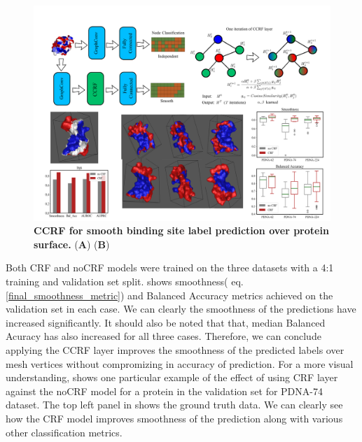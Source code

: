\begin{center}
\begin{figure}[!htp]
                \includegraphics[width=\textwidth]{crf_figs/demo_crf_fig.png}
        \caption[CCRF for smooth binding site label prediction over protein surface.]{\textbf{CCRF
        for smooth binding site label prediction over protein surface.} ({\bf A}) ({\bf B}) }
        \label{fig:ccrf} \end{figure} \end{center}

Both CRF and noCRF models were trained on the three datasets with a 4:1 training and validation set
        split.  shows smoothness( eq.
        \ref{final_smoothness_metric}) and Balanced Accuracy  metrics achieved on the validation set
        in each case. We can clearly the smoothness of the predictions have increased significantly.
        It should also be noted that that, median Balanced Acuracy has also increased for all three
        cases. Therefore, we can conclude applying the CCRF layer improves the smoothness of the
        predicted labels over mesh vertices without compromizing in accuracy of prediction. For a
        more visual understanding,  shows one particular example
        of the effect of using CRF layer against the noCRF model for a protein in the validation set
        for PDNA-74 dataset. The top left panel in  shows the
        ground truth data. We can clearly see how the CRF model improves smoothness of the
        prediction along with various other classification metrics.
